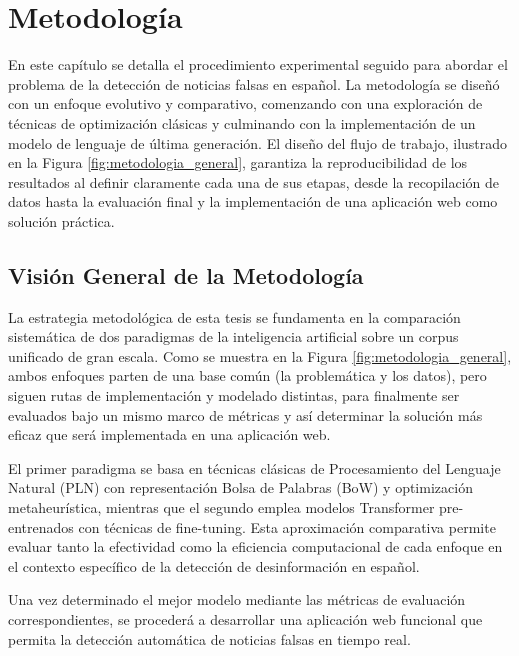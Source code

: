 \chapter{Metodología \label{cap:Metodologia}}

En este capítulo se detalla el procedimiento experimental seguido para abordar el problema de la detección de noticias falsas en español. La metodología se diseñó con un enfoque evolutivo y comparativo, comenzando con una exploración de técnicas de optimización clásicas y culminando con la implementación de un modelo de lenguaje de última generación. El diseño del flujo de trabajo, ilustrado en la Figura \ref{fig:metodologia_general}, garantiza la reproducibilidad de los resultados al definir claramente cada una de sus etapas, desde la recopilación de datos hasta la evaluación final y la implementación de una aplicación web como solución práctica.

\section{Visión General de la Metodología}

La estrategia metodológica de esta tesis se fundamenta en la comparación sistemática de dos paradigmas de la inteligencia artificial sobre un corpus unificado de gran escala. Como se muestra en la Figura \ref{fig:metodologia_general}, ambos enfoques parten de una base común (la problemática y los datos), pero siguen rutas de implementación y modelado distintas, para finalmente ser evaluados bajo un mismo marco de métricas y así determinar la solución más eficaz que será implementada en una aplicación web.

El primer paradigma se basa en técnicas clásicas de Procesamiento del Lenguaje Natural (PLN) con representación Bolsa de Palabras (BoW) y optimización metaheurística, mientras que el segundo emplea modelos Transformer pre-entrenados con técnicas de fine-tuning. Esta aproximación comparativa permite evaluar tanto la efectividad como la eficiencia computacional de cada enfoque en el contexto específico de la detección de desinformación en español.

Una vez determinado el mejor modelo mediante las métricas de evaluación correspondientes, se procederá a desarrollar una aplicación web funcional que permita la detección automática de noticias falsas en tiempo real.

